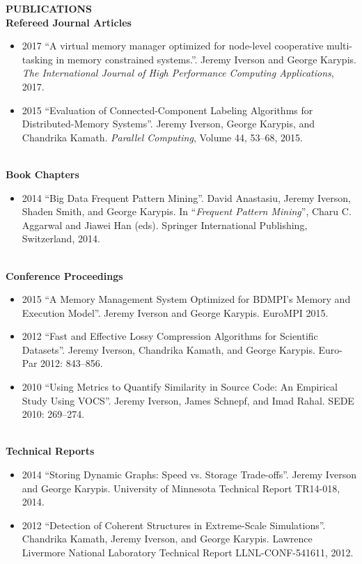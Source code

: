 \documentclass[a4paper,12pt]{article}
\newcommand{\lskip}[1]{\hspace*{1em}\\[#1\baselineskip]}
\newenvironment{Itemize}[0]{
  \vspace{-\parskip}\begin{itemize}
}{
  \end{itemize}
}
\begin{document}
\textbf{PUBLICATIONS}
\lskip{1}
%
\textbf{Refereed Journal Articles}
\begin{Itemize}
  \item[2017] ``A virtual memory manager optimized for node-level cooperative
              multi-tasking in memory constrained systems.''. Jeremy Iverson
              and George Karypis. \textit{The International Journal of High
              Performance Computing Applications}, 2017.
  \item[2015] ``Evaluation of Connected-Component Labeling Algorithms for
              Distributed-Memory Systems''. Jeremy Iverson, George Karypis, and
              Chandrika Kamath. \textit{Parallel Computing}, Volume 44, 53--68,
              2015.
\end{Itemize}
%
\lskip{-2}
%
\textbf{Book Chapters}
\begin{Itemize}
  \item[2014] ``Big Data Frequent Pattern Mining''. David Anastasiu, Jeremy
              Iverson, Shaden Smith, and George Karypis. In ``\textit{Frequent
              Pattern Mining}'', Charu C. Aggarwal and Jiawei Han (eds).
              Springer International Publishing, Switzerland, 2014.
\end{Itemize}
%
\lskip{-2}
%
\textbf{Conference Proceedings}
\begin{Itemize}
  \item[2015] ``A Memory Management System Optimized for BDMPI's Memory and
              Execution Model''. Jeremy Iverson and George Karypis. EuroMPI
              2015.
  \item[2012] ``Fast and Effective Lossy Compression Algorithms for Scientific
              Datasets''. Jeremy Iverson, Chandrika Kamath, and George Karypis.
              Euro-Par 2012: 843--856.
  \item[2010] ``Using Metrics to Quantify Similarity in Source Code: An
              Empirical Study Using VOCS''. Jeremy Iverson, James Schnepf, and
              Imad Rahal. SEDE 2010: 269--274.
\end{Itemize}
%
\lskip{-2}
%
\textbf{Technical Reports}
\begin{Itemize}
  \item[2014] ``Storing Dynamic Graphs: Speed vs. Storage Trade-offs''. Jeremy
              Iverson and George Karypis. University of Minnesota Technical
              Report TR14-018, 2014. %
  \item[2012] ``Detection of Coherent Structures in Extreme-Scale
              Simulations''. Chandrika Kamath, Jeremy Iverson, and George
              Karypis. Lawrence Livermore National Laboratory Technical Report
              LLNL-CONF-541611, 2012.
\end{Itemize}
\end{document}
